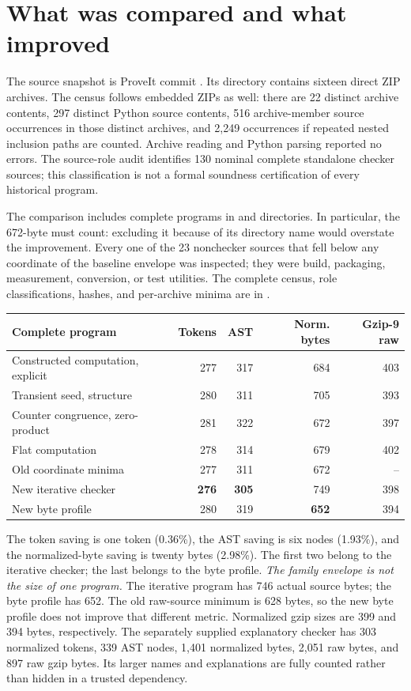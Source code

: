 \section{What was compared and what improved}
\label{sec:results}

The source snapshot is ProveIt commit
. Its
 directory contains sixteen direct ZIP archives.
The census follows embedded ZIPs as well: there are 22 distinct archive
contents, 297 distinct Python source contents, 516 archive-member source
occurrences in those distinct archives, and 2,249 occurrences if repeated
nested inclusion paths are counted. Archive reading and Python parsing
reported no errors. The source-role audit identifies 130 nominal complete
standalone checker sources; this classification is not a formal
soundness certification of every historical program.

The comparison includes complete programs in  and
 directories. In particular, the 672-byte
 must count: excluding it because of its directory
name would overstate the improvement. Every one of the 23 nonchecker
sources that fell below any coordinate of the baseline envelope was inspected;
they were build, packaging, measurement, conversion, or test utilities.
The complete census, role classifications, hashes, and per-archive
minima are in .

\begin{center}\small
\begin{tabular}{lrrrr}
\toprule
Complete program & Tokens & AST & Norm. bytes & Gzip-9 raw\\
\midrule
Constructed computation, explicit &277&317&684&403\\
Transient seed, structure &280&311&705&393\\
Counter congruence, zero-product &281&322&672&397\\
Flat computation &278&314&679&402\\
\midrule
Old coordinate minima &277&311&672&--\\
New iterative checker &\textbf{276}&\textbf{305}&749&398\\
New byte profile &280&319&\textbf{652}&394\\
\bottomrule
\end{tabular}
\end{center}

The token saving is one token (0.36\%), the AST saving is six nodes
(1.93\%), and the normalized-byte saving is twenty bytes (2.98\%).
The first two belong to the iterative checker; the last belongs to
the byte profile. \emph{The family envelope is not the size of one program.}
The iterative program has 746 actual source bytes; the byte profile has
652. The old raw-source minimum is 628 bytes, so the new byte profile
does not improve that different metric. Normalized gzip sizes are
399 and 394 bytes, respectively. The separately supplied explanatory
checker has 303 normalized tokens, 339 AST nodes, 1,401 normalized bytes,
2,051 raw bytes, and 897 raw gzip bytes. Its larger names and explanations
are fully counted rather than hidden in a trusted dependency.

